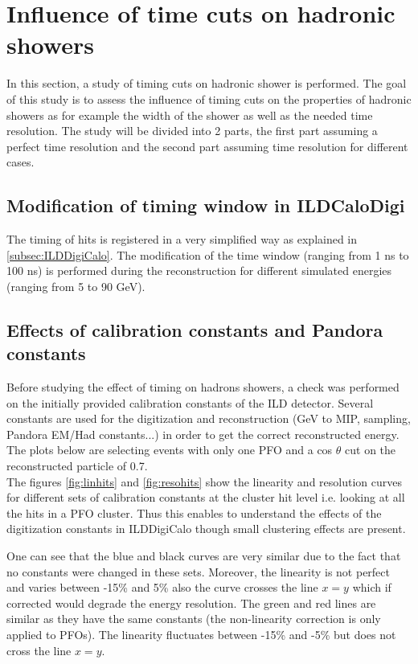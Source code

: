 \section{Influence of time cuts on hadronic showers}
\label{sec:ILDTiming}

In this section, a study of timing cuts on hadronic shower is performed. The goal of this study is to assess the influence of timing cuts on the properties of hadronic showers as for example the width of the shower as well as the needed time resolution. The study will be divided into 2 parts, the first part assuming a perfect time resolution and the second part assuming time resolution for different cases.

\subsection{Modification of timing window in ILDCaloDigi}

The timing of hits is registered in a very simplified way as explained in \ref{subsec:ILDDigiCalo}. The modification of the time window (ranging from 1 ns to 100 ns) is performed during the reconstruction for different simulated \kzeroL{} energies (ranging from 5 to 90 GeV).

\subsection{Effects of calibration constants and Pandora constants}

Before studying the effect of timing on hadrons showers, a check was performed on the initially provided calibration constants of the ILD detector. Several constants are used for the digitization and reconstruction (GeV to MIP, sampling, Pandora EM/Had constants...) in order to get the correct reconstructed energy. The plots below are selecting events with only one PFO and a cos $\theta$ cut on the reconstructed particle of 0.7.\\

The figures \ref{fig:linhits} and \ref{fig:resohits} show the linearity and resolution curves for different sets of calibration constants at the cluster hit level i.e. looking at all the hits in a PFO cluster. Thus this enables to understand the effects of the digitization constants in ILDDigiCalo though small clustering effects are present.

One can see that the blue and black curves are very similar due to the fact that no constants were changed in these sets. Moreover, the linearity is not perfect and varies between -15\% and 5\% also the curve crosses the line $x=y$ which if corrected would degrade the energy resolution. The green and red lines are similar as they have the same constants (the non-linearity correction is only applied to PFOs). The linearity fluctuates between -15\% and -5\% but does not cross the line $x=y$.

